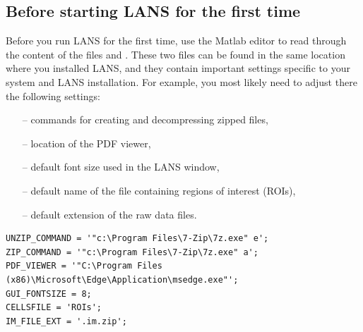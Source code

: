 
\subsection{Before starting LANS for the first time}
\setcounter{step}{0}

\goldbox{}
Before you run LANS for the first time, use the Matlab editor to read through the content of the files  and . These two files can be found in the same location where you installed LANS, and they contain important settings specific to your system and LANS installation.  For example, you most likely need to adjust there the following settings:

\begin{itemize}%
\item[--] commands for creating and decompressing zipped files,
\item[--] location of the PDF viewer,
\item[--] default font size used in the LANS window,
\item[--] default name of the file containing regions of interest (ROIs),
\item[--] default extension of the raw data files.
\end{itemize}
\tcbe

\begin{center}
\begin{minipage}{\textwidth}\footnotesize
\begin{verbatim}
UNZIP_COMMAND = '"c:\Program Files\7-Zip\7z.exe" e';
ZIP_COMMAND = '"c:\Program Files\7-Zip\7z.exe" a';
PDF_VIEWER = '"C:\Program Files (x86)\Microsoft\Edge\Application\msedge.exe"';
GUI_FONTSIZE = 8;
CELLSFILE = 'ROIs';
IM_FILE_EXT = '.im.zip';
\end{verbatim}
\end{minipage}
\end{center}


